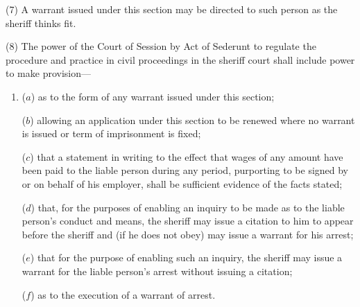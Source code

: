 \documentclass[12pt,a4paper]{article}
\begin{document}
(7) A warrant issued under this section may be directed to such person as the sheriff
thinks fit.

(8) The power of the Court of Session by Act of Sederunt to regulate the procedure
and practice in civil proceedings in the sheriff court shall include power to make
provision---
\begin{enumerate}\item[]
($a$) as to the form of any warrant issued under this section;

($b$) allowing an application under this section to be renewed where no warrant is
issued or term of imprisonment is fixed;

($c$) that a statement in writing to the effect that wages of any amount have been
paid to the liable person during any period, purporting to be signed by or on
behalf of his employer, shall be sufficient evidence of the facts stated;

($d$) that, for the purposes of enabling an inquiry to be made as to the liable
person’s conduct and means, the sheriff may issue a citation to him to appear
before the sheriff and (if he does not obey) may issue a warrant for his arrest;

($e$) that for the purpose of enabling such an inquiry, the sheriff may issue a
warrant for the liable person’s arrest without issuing a citation;

($f$) as to the execution of a warrant of arrest.
\end{enumerate}

\end{document}

